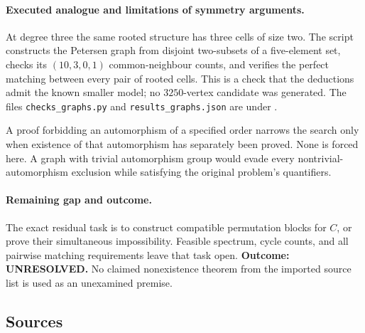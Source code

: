 \documentclass[11pt,a4paper]{article}
\begin{document}
\paragraph{Executed analogue and limitations of symmetry arguments.}
At degree three the same rooted structure has three cells of size two.
The script constructs the Petersen graph from disjoint two-subsets of
a five-element set, checks its $(10,3,0,1)$ common-neighbour counts,
and verifies the perfect matching between every pair of rooted cells.
This is a check that the deductions admit the known smaller model;
no $3250$-vertex candidate was generated. The files
\texttt{checks\_graphs.py} and \texttt{results\_graphs.json} are under
.

A proof forbidding an automorphism of a specified order narrows the
search only when existence of that automorphism has separately been
proved. None is forced here. A graph with trivial automorphism group
would evade every nontrivial-automorphism exclusion while satisfying
the original problem's quantifiers.

\paragraph{Remaining gap and outcome.}
The exact residual task is to construct compatible permutation blocks
for $C$, or prove their simultaneous impossibility. Feasible spectrum,
cycle counts, and all pairwise matching requirements leave that task
open. \textbf{Outcome: UNRESOLVED.} No claimed nonexistence theorem
from the imported source list is used as an unexamined premise.

\subsection{Sources}
\end{document}
